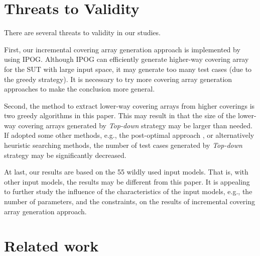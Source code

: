 \documentclass[conference]{IEEEtran}
\theoremstyle{definition}
\begin{document}
\section{Threats to Validity}
There are several threats to validity in our studies.

First, our incremental covering array generation approach is implemented by using IPOG. Although IPOG can efficiently generate higher-way covering array for the SUT with large input space, it may generate too many test cases (due to the greedy strategy). It is necessary to try more covering array generation approaches to make the conclusion more general.

Second, the method to extract lower-way covering arrays from higher coverings is  two greedy algorithms in this paper. This may result in that the size of the lower-way covering arrays generated by \emph{Top-down} strategy may be larger than needed. If adopted some other methods, e.g., the post-optimal approach \cite{li2014refining,nayeri2013randomized}, or alternatively heuristic searching methods, the number of test cases generated by \emph{Top-down} strategy may be significantly decreased.

At last, our results are based on the 55 wildly used input models. That is, with other input models, the results may be different from this paper. It is appealing to further study the influence of the characteristics of the input models, e.g., the number of parameters, and the constraints, on the results of incremental covering array generation approach.

\section{Related work}
\end{document}
